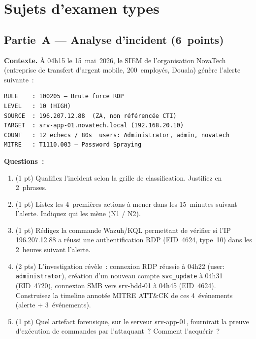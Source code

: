 \section{Sujets d'examen types}
\label{sec:sujets-types}

\subsection{Partie~A --- Analyse d'incident (6~points)}

\begin{boxexo}
\textbf{Contexte.}
À 04h15 le 15~mai~2026, le SIEM de l'organisation NovaTech (entreprise
de transfert d'argent mobile, 200~employés, Douala) génère l'alerte
suivante~:

\begin{verbatim}
RULE    : 100205 — Brute force RDP
LEVEL   : 10 (HIGH)
SOURCE  : 196.207.12.88  (ZA, non référencée CTI)
TARGET  : srv-app-01.novatech.local (192.168.20.10)
COUNT   : 12 echecs / 80s  users: Administrator, admin, novatech
MITRE   : T1110.003 — Password Spraying
\end{verbatim}

\textbf{Questions~:}

\begin{enumerate}[label=\textbf{Q\arabic*.}]
  \item (1 pt) Qualifiez l'incident selon la grille de classification.
        Justifiez en 2~phrases.
  \item (1 pt) Listez les 4~premières actions à mener dans les
        15~minutes suivant l'alerte. Indiquez qui les mène (N1 / N2).
  \item (1 pt) Rédigez la commande Wazuh/KQL permettant de vérifier
        si l'IP 196.207.12.88 a réussi une authentification
        RDP (EID~4624, type~10) dans les 2~heures suivant l'alerte.
  \item (2 pts) L'investigation révèle~: connexion RDP réussie à 04h22
        (user: \texttt{administrator}), création d'un nouveau compte
        \texttt{svc\_update} à 04h31 (EID~4720), connexion SMB vers
        srv-bdd-01 à 04h45 (EID~4624). Construisez la timeline annotée
        MITRE ATT\&CK de ces 4~événements (alerte + 3~événements).
  \item (1 pt) Quel artefact forensique, sur le serveur srv-app-01,
        fournirait la preuve d'exécution de commandes par l'attaquant~?
        Comment l'acquérir~?
\end{enumerate}
\end{boxexo}

